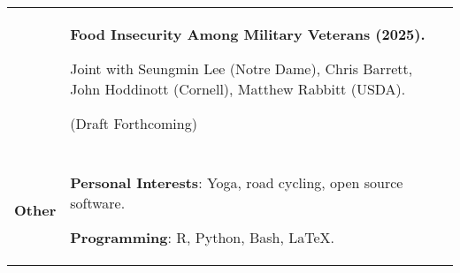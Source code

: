 \documentclass[letterpaper,11pt,oneside]{article}
\begin{document}
\begin{longtable}[\textwidth]{p{} p{}}
    & \textbf{Food Insecurity Among Military Veterans (2025).}

    Joint with Seungmin Lee (Notre Dame), Chris Barrett, John Hoddinott (Cornell), Matthew Rabbitt (USDA).

    (Draft Forthcoming) \\ \\

%

    \vfill \textbf{Other}
    & \vfill \textbf{Personal Interests}: Yoga, road cycling, open source software.
    
    \textbf{Programming}: R, Python, Bash, \LaTeX.
\end{longtable}
\end{document}
